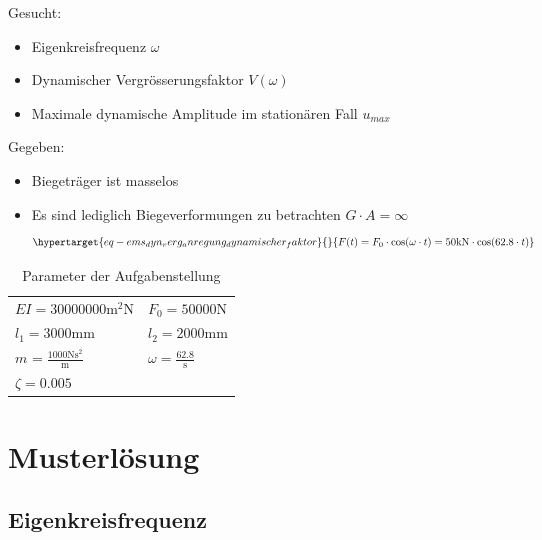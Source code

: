 \documentclass[
  letterpaper,
  DIV=11]{scrreprt}
\providecommand{\tightlist}{%
  \setlength{\itemsep}{0pt}\setlength{\parskip}{0pt}}\usepackage{longtable,booktabs,array}
\begin{document}
Gesucht:

\begin{itemize}
\tightlist
\item
  Eigenkreisfrequenz \(\omega\)
\item
  Dynamischer Vergrösserungsfaktor \(V(\omega)\)
\item
  Maximale dynamische Amplitude im stationären Fall \(u_{max}\)
\end{itemize}

Gegeben:

\begin{itemize}
\tightlist
\item
  Biegeträger ist masselos
\item
  Es sind lediglich Biegeverformungen zu betrachten
  \(G \cdot A = \infty\)
  \begin{equation}\protect\hypertarget{eq-ems_dyn_verg_anregung_dynamischer_faktor}{}{
  F(t) = F_0 \cdot \cos(\omega \cdot t) = 50 \text{kN} \cdot \cos(62.8 \cdot t)
  }\label{eq-ems_dyn_verg_anregung_dynamischer_faktor}\end{equation}
\end{itemize}

\hypertarget{tbl-parameter_vergroess}{}
\begin{longtable}[]{@{}
  >{\raggedright\arraybackslash}p{}
  >{\raggedright\arraybackslash}p{}@{}}
\caption{\label{tbl-parameter_vergroess}Parameter der
Aufgabenstellung}\tabularnewline
\toprule\noalign{}
\endfirsthead
\endhead
\bottomrule\noalign{}
\endlastfoot
\(EI = 30000000 \text{m}^{2} \text{N}\) & \(F_{0} = 50000 \text{N}\) \\
\(l_{1} = 3000 \text{mm}\) & \(l_{2} = 2000 \text{mm}\) \\
\(m_{} = \frac{1000 \text{N} \text{s}^{2}}{\text{m}}\) &
\(\omega = \frac{62.8}{\text{s}}\) \\
\(\zeta = 0.005\) & \\
\end{longtable}

\newpage{}

\hypertarget{musterluxf6sung-3}{%
\section{Musterlösung}\label{musterluxf6sung-3}}

\hypertarget{eigenkreisfrequenz-2}{%
\subsection{Eigenkreisfrequenz}\label{eigenkreisfrequenz-2}}
\end{document}
